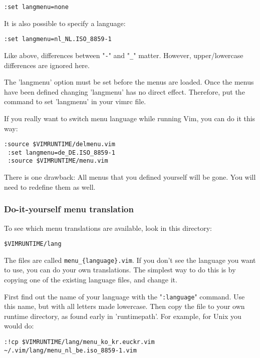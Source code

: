\begin{Verbatim}[samepage=true]
 :set langmenu=none
\end{Verbatim}

It is also possible to specify a language:

\begin{Verbatim}[samepage=true]
 :set langmenu=nl_NL.ISO_8859-1
\end{Verbatim}

Like above, differences between "\verb!-!" and "\verb!_!" matter.
However, upper/lowercase differences are ignored here.

The 'langmenu' option must be set before the menus are loaded.
Once the menus have been defined changing 'langmenu' has no direct effect.
Therefore, put the command to set 'langmenu' in your vimrc file.

If you really want to switch menu language while running Vim, you can do it this way:

\begin{Verbatim}[samepage=true]
 :source $VIMRUNTIME/delmenu.vim
 :set langmenu=de_DE.ISO_8859-1
 :source $VIMRUNTIME/menu.vim
\end{Verbatim}

There is one drawback: All menus that you defined yourself will be gone.
You will need to redefine them as well.

\subsubsection{Do-it-yourself menu translation}
To see which menu translations are available, look in this directory:

\begin{Verbatim}[samepage=true]
    $VIMRUNTIME/lang 
\end{Verbatim}

The files are called \verb!menu_{language}.vim!.
If you don't see the language you want to use, you can do your own translations.
The simplest way to do this is by copying one of the existing language files, and change it.

First find out the name of your language with the "\verb!:language!" command.
Use this name, but with all letters made lowercase.
Then copy the file to your own runtime directory, as found early in 'runtimepath'.
For example, for Unix you would do:

\begin{Verbatim}[samepage=true]
 :!cp $VIMRUNTIME/lang/menu_ko_kr.euckr.vim ~/.vim/lang/menu_nl_be.iso_8859-1.vim
\end{Verbatim}

